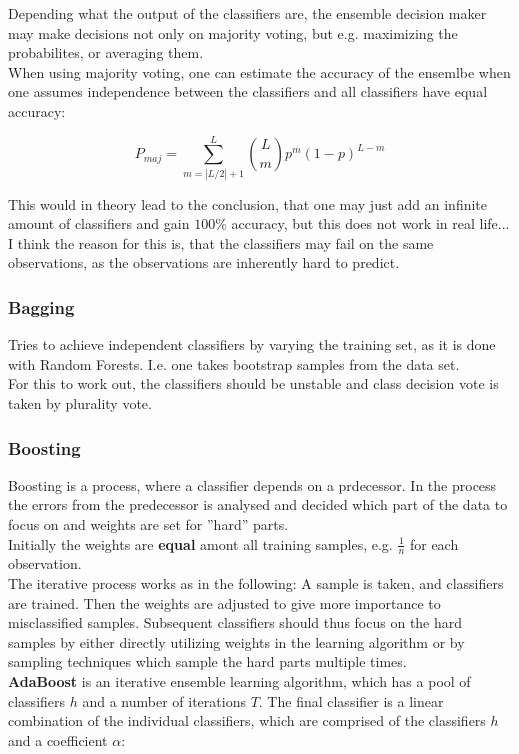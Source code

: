\documentclass[12pt,a4paper]{article}
\begin{document}
\noindent Depending what the output of the classifiers are, the ensemble decision maker may make decisions not only on majority voting, but e.g. maximizing the probabilites, or averaging them.\\
When using majority voting, one can estimate the accuracy of the ensemlbe when one assumes independence between the classifiers and all classifiers have equal accuracy:

\[P_{maj} = \sum_{m = |L/2| + 1}^L \binom{L}{m} p^m (1 - p)^{L - m} \]

\noindent This would in theory lead to the conclusion, that one may just add an infinite amount of classifiers and gain \(100\%\) accuracy, but this does not work in real life... I think the reason for this is, that the classifiers may fail on the same observations, as the observations are inherently hard to predict.\\[1em]

\subsubsection{Bagging}

\noindent Tries to achieve independent classifiers by varying the training set, as it is done with Random Forests. I.e. one takes bootstrap samples from the data set.\\
For this to work out, the classifiers should be unstable and class decision vote is taken by plurality vote.

\subsubsection{Boosting}

\noindent Boosting is a process, where a classifier depends on a prdecessor. In the process the errors from the predecessor is analysed and decided which part of the data to focus on and weights are set for ''hard'' parts.\\
Initially the weights are \textbf{equal} amont all training samples, e.g. \(\frac{1}{n}\) for each observation.\\[1em]
The iterative process works as in the following: A sample is taken, and classifiers are trained. Then the weights are adjusted to give more importance to misclassified samples. Subsequent classifiers should thus focus on the hard samples by either directly utilizing weights in the learning algorithm or by sampling techniques which sample the hard parts multiple times.\\[1em]
\textbf{AdaBoost} is an iterative ensemble learning algorithm, which has a pool of classifiers \(h\) and a number of iterations \(T\). The final classifier is a linear combination of the individual classifiers, which are comprised of the classifiers \(h\) and a coefficient \(\alpha\):
\end{document}
